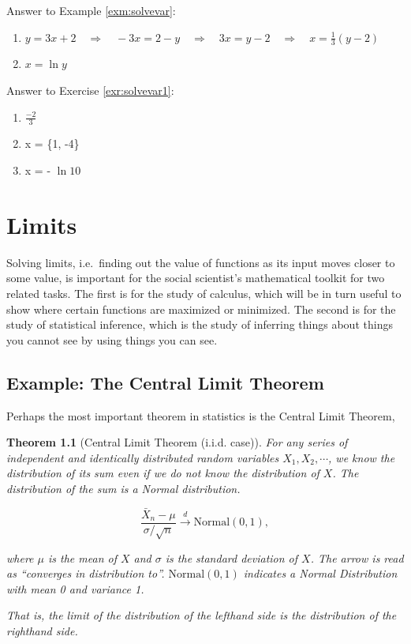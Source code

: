 \documentclass[
]{book}
\newtheorem{theorem}{Theorem}[chapter]
\theoremstyle{definition}
\theoremstyle{definition}
\theoremstyle{definition}
\theoremstyle{remark}
\begin{document}
Answer to Example \ref{exm:solvevar}:

\begin{enumerate}
\def\labelenumi{\arabic{enumi}.}
\item
  \(y=3x+2 \quad\Longrightarrow\quad -3x=2-y \quad\Longrightarrow\quad 3x=y-2 \quad\Longrightarrow\quad x=\frac{1}{3}(y-2)\)
\item
  \(x = \ln{y}\)
\end{enumerate}

Answer to Exercise \ref{exr:solvevar1}:

\begin{enumerate}
\def\labelenumi{\arabic{enumi}.}
\item
  \(\frac{-2}{3}\)
\item
  x = \{1, -4\}
\item
  x = - \(\ln10\)
\end{enumerate}

\hypertarget{limits-precalc}{%
\chapter{Limits}\label{limits-precalc}}

Solving limits, i.e.~finding out the value of functions as its input moves closer to some value, is important for the social scientist's mathematical toolkit for two related tasks. The first is for the study of calculus, which will be in turn useful to show where certain functions are maximized or minimized. The second is for the study of statistical inference, which is the study of inferring things about things you cannot see by using things you can see.

\hypertarget{example-the-central-limit-theorem}{%
\section*{Example: The Central Limit Theorem}\label{example-the-central-limit-theorem}}

Perhaps the most important theorem in statistics is the Central Limit Theorem,

\begin{theorem}[Central Limit Theorem (i.i.d. case)]
\protect\hypertarget{thm:clt-lim}{}{\label{thm:clt-lim} {} }For any series of independent and identically distributed random variables \(X_1, X_2, \cdots\), we know the distribution of its sum even if we do not know the distribution of \(X\). The distribution of the sum is a Normal distribution.

\[\frac{\bar{X}_n - \mu}{\sigma / \sqrt{n}} \xrightarrow{d} \text{Normal}(0, 1),\]

where \(\mu\) is the mean of \(X\) and \(\sigma\) is the standard deviation of \(X\). The arrow is read as ``converges in distribution to''. \(\text{Normal}(0, 1)\) indicates a Normal Distribution with mean 0 and variance 1.

That is, the limit of the distribution of the lefthand side is the distribution of the righthand side.
\end{theorem}
\end{document}
